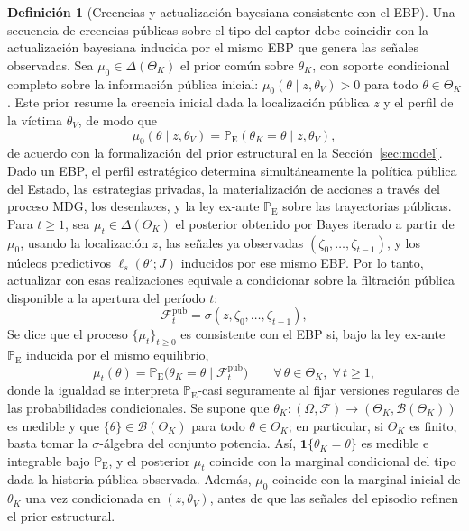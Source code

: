 \documentclass[review,authoryear,12pt]{elsarticle}
\theoremstyle{plain}
\theoremstyle{definition}
\newtheorem{definition}[theorem]{Definición}
\newcommand{\ProbE}{\mathbb{P}_{\mathrm{E}}}
\newcommand{\ThetaK}{\Theta_K}
\newcommand{\1}{\mathbf{1}}
\begin{document}
\begin{definition}[Creencias y actualización bayesiana consistente con el EBP]\label{def:beliefs-martingale}
Una secuencia de creencias públicas sobre el tipo del captor debe coincidir con la actualización bayesiana inducida por el mismo EBP que genera las señales observadas. Sea $\mu_0\in\Delta(\ThetaK)$ el prior común sobre $\theta_K$, con soporte condicional completo sobre la información pública inicial: $\mu_0(\theta \mid z,\theta_V)>0$ para todo $\theta\in\ThetaK$. Este prior resume la creencia inicial dada la localización pública $z$ y el perfil de la víctima $\theta_V$, de modo que
\[
\mu_0(\theta \mid z,\theta_V)=\ProbE(\theta_K=\theta\mid z,\theta_V),
\]
de acuerdo con la formalización del prior estructural en la Sección~\ref{sec:model}. Dado un EBP, el perfil estratégico determina simultáneamente la política pública del Estado, las estrategias privadas, la materialización de acciones a través del proceso MDG, los desenlaces, y la ley ex-ante $\ProbE$ sobre las trayectorias públicas. Para $t\ge 1$, sea $\mu_t\in\Delta(\ThetaK)$ el posterior obtenido por Bayes iterado a partir de $\mu_0$, usando la localización $z$, las señales ya observadas $(\zeta_0,\ldots,\zeta_{t-1})$, y los núcleos predictivos $\ell_s(\theta';J)$ inducidos por ese mismo EBP. Por lo tanto, actualizar con esas realizaciones equivale a condicionar sobre la filtración pública disponible a la apertura del período $t$:
\[
\mathcal{F}_t^{\mathrm{pub}}=\sigma(z,\zeta_0,\ldots,\zeta_{t-1}),
\]
Se dice que el proceso $\{\mu_t\}_{t\ge 0}$ es consistente con el EBP si, bajo la ley ex-ante $\ProbE$ inducida por el mismo equilibrio,
\begin{equation}
\label{eq:beliefs-ebp-consistency}
\mu_t(\theta)=\ProbE\bigl(\theta_K=\theta\mid\mathcal{F}_t^{\mathrm{pub}}\bigr)\qquad \forall\,\theta\in\ThetaK,\;\forall\,t\ge 1,
\end{equation}
donde la igualdad se interpreta $\ProbE$-casi seguramente al fijar versiones regulares de las probabilidades condicionales. Se supone que $\theta_K:(\Omega,\mathcal{F})\to(\ThetaK,\mathcal{B}(\ThetaK))$ es medible y que $\{\theta\}\in\mathcal{B}(\ThetaK)$ para todo $\theta\in\ThetaK$; en particular, si $\ThetaK$ es finito, basta tomar la $\sigma$-álgebra del conjunto potencia. Así, $\mathbf{1}\{\theta_K=\theta\}$ es medible e integrable bajo $\ProbE$, y el posterior $\mu_t$ coincide con la marginal condicional del tipo dada la historia pública observada. Además, $\mu_0$ coincide con la marginal inicial de $\theta_K$ una vez condicionada en $(z, \theta_V)$, antes de que las señales del episodio refinen el prior estructural.
\end{definition}
\end{document}
